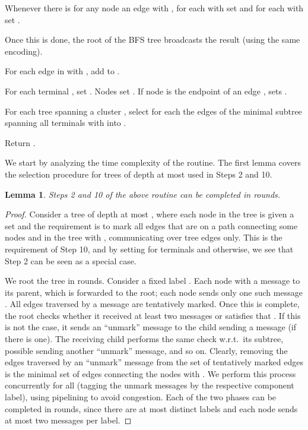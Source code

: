 \documentclass[letterpaper,11pt]{article}
\newtheorem{lemma}[theorem]{Lemma}
\begin{document}
\begin{compactenum}
\begin{compactitem}
\item Whenever there is for any node  an edge  with
, for each  with  set  and
for each  with  set .
\end{compactitem}
\item Once this is done, the root  of the BFS tree broadcasts the result
(using the same encoding).
\item For each edge in  with , add  to
.
\item For each terminal , set . Nodes  set . If node  is the endpoint of an edge
,  sets .
\item For each tree spanning a cluster , select for each
 the edges of the minimal subtree spanning all terminals  with  into .
\item Return .
\end{compactenum}

We start by analyzing the time complexity of the routine. The first lemma covers
the selection procedure for trees of depth at most  used in Steps 2 and
10.

\begin{lemma}\label{lemma:prune_2_10}
Steps 2 and 10 of the above routine can be completed in  rounds.
\end{lemma}
\begin{proof}
Consider a tree of depth at most , where each node  in the tree is
given a set  and the requirement is to mark all edges
that are on a path connecting some nodes  and  in the tree with , communicating over tree edges only. This is the
requirement of Step 10, and by setting  for terminals  and
 otherwise, we see that Step 2 can be seen as a special case.

We root the tree in  rounds. Consider a fixed label . Each node  with  a message  to its parent,
which is forwarded to the root; each node sends only one such message .
All edges traversed by a message are tentatively marked. Once this is complete,
the root  checks whether it received at least two messages  or
satisfies that . If this is not the case, it sends an ``unmark''
message to the child sending a  message (if there is one). The receiving
child performs the same check w.r.t.\ its subtree, possible sending another
``unmark'' message, and so on. Clearly, removing the edges traversed by an
``unmark'' message from the set of tentatively marked edges is the minimal set
of edges connecting the nodes with . We perform this process
concurrently for all  (tagging the unmark messages by the
respective component label), using pipelining to avoid congestion. Each of
the two phases can be completed in  rounds, since there are at
most  distinct labels and each node sends at most two messages per label.
\end{proof}
\end{document}
